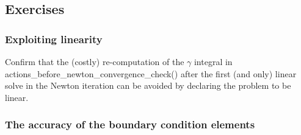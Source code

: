 \hypertarget{index_ex}{}\subsection{Exercises}\label{index_ex}
\hypertarget{index_lin}{}\subsubsection{Exploiting linearity}\label{index_lin}
Confirm that the (costly) re-\/computation of the $ \gamma $ integral in {\ttfamily actions\+\_\+before\+\_\+newton\+\_\+convergence\+\_\+check()} after the first (and only) linear solve in the Newton iteration can be avoided by declaring the problem to be linear.\hypertarget{index_acc_ex}{}\subsubsection{The accuracy of the boundary condition elements}\label{index_acc_ex}

